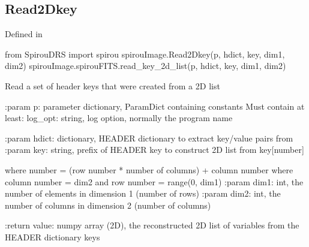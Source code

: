 
\begin{minipage}{\textwidth}
\subsection{Read2Dkey}

Defined in \spirouImage{}

\begin{pythonbox}
from SpirouDRS import spirou
spirouImage.Read2Dkey(p, hdict, key, dim1, dim2)
spirouImage.spirouFITS.read_key_2d_list(p, hdict, key, dim1, dim2)
\end{pythonbox}

\begin{pythondocstring}
Read a set of header keys that were created from a 2D list

:param p: parameter dictionary, ParamDict containing constants
    Must contain at least:
            log_opt: string, log option, normally the program name

:param hdict: dictionary, HEADER dictionary to extract key/value pairs from
:param key: string, prefix of HEADER key to construct 2D list from
             key[number]

             where number = (row number * number of columns) + column number
             where column number = dim2 and row number = range(0, dim1)
:param dim1: int, the number of elements in dimension 1 (number of rows)
:param dim2: int, the number of columns in dimension 2 (number of columns)

:return value: numpy array (2D), the reconstructed 2D list of variables
               from the HEADER dictionary keys
\end{pythondocstring}
\end{minipage}


